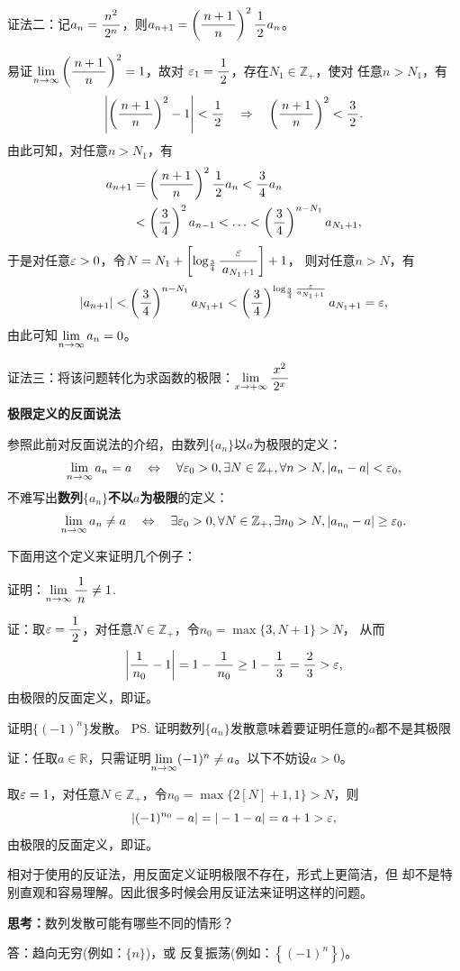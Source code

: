 证法二：记$a_n=\df{n^2}{2^n}$，则$a_{n+1}
=\left(\df{n+1}{n}\right)^2\df12a_n$。

易证$\limn\left(\df{n+1}n\right)^2=1$，故对
$\e_1=\df12$，存在$N_1\in\mathbb{Z}_+$，使对
任意$n>N_1$，有
$$\left|\left(\df{n+1}n\right)^2-1\right|<\df12
\quad\Rightarrow\quad \left(\df{n+1}n\right)^2<\df32.$$
由此可知，对任意$n>N_1$，有
\begin{align*}
	a_{n+1}&=\left(\df{n+1}n\right)^2\df12a_n
	<\df34a_n\\
	&<\left(\df34\right)^2a_{n-1}<\ldots<
	\left(\df34\right)^{n-N_1}a_{N_1+1},
\end{align*}
于是对任意$\e>0$，令$N=N_1
+\left[\log_{\frac34}\df{\e}{a_{N_1+1}}\right]+1$，
则对任意$n>N$，有
\begin{align*}
	|a_{n+1}|<\left(\df34\right)^{n-N_1}a_{N_1+1}
	<\left(\df34\right)^{\log_{\frac34}\frac{\e}{a_{N_1+1}}}a_{N_1+1}
	=\e,
\end{align*}
由此可知$\limn a_n=0$。\fin

证法三：将该问题转化为求函数的极限：$\limx{+\infty}\df{x^2}{2^x}$
\fi

\begin{shaded}
	{\bf 极限定义的反面说法}
	
	参照此前对反面说法的介绍，由数列$\{a_n\}$以$a$为极限的定义：
	$$\limn a_n= a\quad\Leftrightarrow\quad\forall\e_0>0,
	\exists N\in\mathbb{Z}_+,\forall n>N,|a_n-a|<\e_0,$$
	不难写出{\bf 数列$\{a_n\}$不以$a$为极限}的定义：
	$$\limn a_n\neq a\quad\Leftrightarrow\quad\exists\e_0>0,
	\forall N\in\mathbb{Z}_+,\exists n_0>N,|a_{n_0}-a|\geq\e_0.$$
	
	\bs
	下面用这个定义来证明几个例子：
	
	\egz 证明：$\limn\df 1n\neq 1$.
	
	证：取$\e=\df12$，对任意$N\in\mathbb{Z}_+$，令$n_0=\max\{3,N+1\}>N$，
	从而
	$$\left|\df1{n_0}-1\right|=1-\df1{n_0}\geq 1-\df13=\df23>\e,$$
	由极限的反面定义，即证。\fin
	
	\bs
	\egz 证明$\{(-1)^n\}$发散。
	\ps{证明数列$\{a_n\}$发散意味着要证明任意的$a$都不是其极限}
	
	证：任取$a\in\mathbb{R}$，只需证明$\limn(-1)^n\ne a$。以下不妨设$a>0$。
	
	取$\e=1$，对任意$N\in\mathbb{Z}_+$，令$n_0=\max\{2[N]+1,1\}>N$，则
	$$\left|(-1)^{n_0}-a\right|=|-1-a|=a+1>\e,$$
	由极限的反面定义，即证。\fin
	
	相对于使用的反证法，用反面定义证明极限不存在，形式上更简洁，但
	却不是特别直观和容易理解。因此很多时候会用反证法来证明这样的问题。
	
	\bs
	{\bf 思考：}数列发散可能有哪些不同的情形？

	\ifhint
	答：趋向无穷(例如：$\{n\}$)，或
	反复振荡(例如：$\left\{(-1)^n\right\}$)。
	\fi
\end{shaded}

